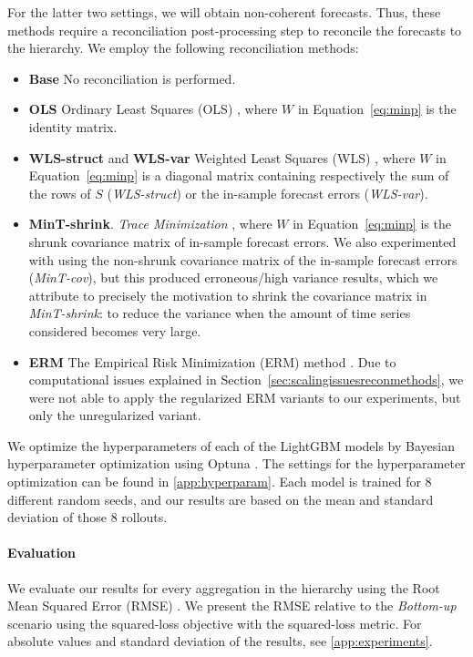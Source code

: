 \documentclass[preprint, 3p, times, twocolumn]{elsarticle}
\begin{document}
  For the latter two settings, we will obtain non-coherent forecasts. Thus, these methods require a reconciliation post-processing step to reconcile the forecasts to the hierarchy. We employ the following reconciliation methods:
  \begin{itemize}
    \item \textbf{Base} No reconciliation is performed.
    \item \textbf{OLS} Ordinary Least Squares (OLS) \cite{hyndman_optimal_2011}, where \(W\) in Equation~\eqref{eq:minp} is the identity matrix.
    \item \textbf{WLS-struct} and \textbf{WLS-var} Weighted Least Squares (WLS) \cite{wickramasuriya_optimal_2019}, where \(W\) in Equation~\eqref{eq:minp} is a diagonal matrix containing respectively the sum of the rows of \(S\) (\textit{WLS-struct}) or the in-sample forecast errors (\textit{WLS-var}).
    \item \textbf{MinT-shrink}. \textit{Trace Minimization} \cite{wickramasuriya_optimal_2019}, where \(W\) in Equation~\eqref{eq:minp} is the shrunk covariance matrix of in-sample forecast errors. We also experimented with using the non-shrunk covariance matrix of the in-sample forecast errors (\textit{MinT-cov}), but this produced erroneous/high variance results, which we attribute to precisely the motivation to shrink the covariance matrix in \textit{MinT-shrink}: to reduce the variance when the amount of time series considered becomes very large.
    \item \textbf{ERM} The Empirical Risk Minimization (ERM) method \cite{bentaieb_regularized_2019}. Due to computational issues explained in Section~\ref{sec:scalingissuesreconmethods}, we were not able to apply the regularized ERM variants to our experiments, but only the unregularized variant.
  \end{itemize}
  
  We optimize the hyperparameters of each of the LightGBM models by Bayesian hyperparameter optimization using Optuna \cite{akiba_optuna_2019}. The settings for the hyperparameter optimization can be found in \ref{app:hyperparam}. Each model is trained for 8 different random seeds, and our results are based on the mean and standard deviation of those 8 rollouts. 

  \paragraph{Evaluation} We evaluate our results for every aggregation in the hierarchy using the Root Mean Squared Error (RMSE) \cite{hyndman_forecasting_2021}. We present the RMSE relative to the \textit{Bottom-up} scenario using the squared-loss objective with the squared-loss metric. For absolute values and standard deviation of the results, see \ref{app:experiments}.
\end{document}
